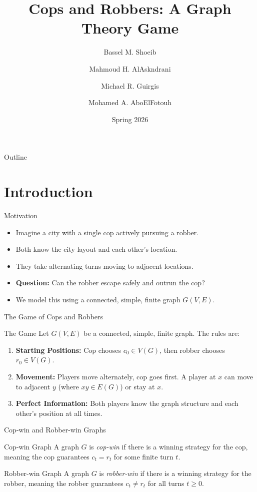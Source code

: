 \documentclass[10pt, aspectratio=169]{beamer}
\title{Cops and Robbers: A Graph Theory Game}
\author[The American University in Cairo]{Bassel M. Shoeib \and Mahmoud H. AlAskndrani \\ \and Michael R. Guirgis \and Mohamed A. AboElFotouh}
\institute[]{The American University in Cairo}
\date{Spring 2026}
\begin{document}
\begin{frame}
    \titlepage
\end{frame}

\begin{frame}{Outline}
    \tableofcontents
\end{frame}

\section{Introduction}

\begin{frame}{Motivation}
    \begin{itemize}
        \item Imagine a city with a single cop actively pursuing a robber.
        \item Both know the city layout and each other's location.
        \item They take alternating turns moving to adjacent locations.
        \item \textbf{Question:} Can the robber escape safely and outrun the cop?
        \item We model this using a connected, simple, finite graph $G(V, E)$.
    \end{itemize}
\end{frame}

\begin{frame}{The Game of Cops and Robbers}
    \begin{alertblock}{The Game}
    Let $G(V, E)$ be a connected, simple, finite graph. The rules are:
    \begin{enumerate}
        \item \textbf{Starting Positions:} Cop chooses $c_0 \in V(G)$, then robber chooses $r_0 \in V(G)$.
        \item \textbf{Movement:} Players move alternately, cop goes first. A player at $x$ can move to adjacent $y$ (where $xy \in E(G)$) or stay at $x$.
        \item \textbf{Perfect Information:} Both players know the graph structure and each other's position at all times.
    \end{enumerate}
    \end{alertblock}
\end{frame}

\begin{frame}{Cop-win and Robber-win Graphs}
    \begin{block}{Cop-win Graph}
        A graph $G$ is \textit{cop-win} if there is a winning strategy for the cop, meaning the cop guarantees $c_t = r_t$ for some finite turn $t$.
    \end{block}

    \begin{exampleblock}{Robber-win Graph}
        A graph $G$ is \textit{robber-win} if there is a winning strategy for the robber, meaning the robber guarantees $c_t \neq r_t$ for all turns $t \ge 0$.
    \end{exampleblock}
\end{frame}
\end{document}
